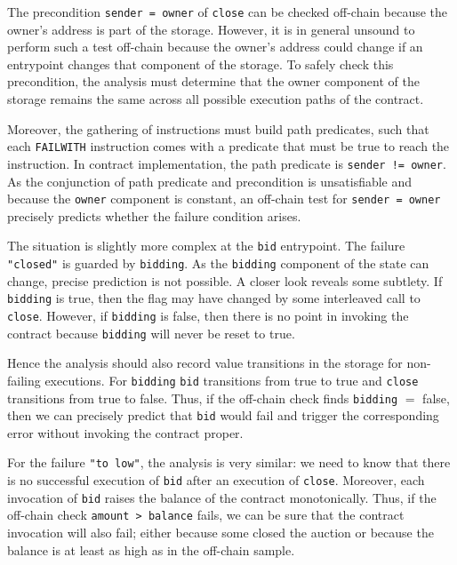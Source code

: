 \documentclass[a4paper,USenglish,american,cleveref, autoref, thm-restate]{oasics-v2021}
\begin{document}
The precondition \lstinline/sender = owner/ of \lstinline/close/ can
be checked off-chain because the owner's address is part of the
storage. However, it is in general unsound to perform such a test
off-chain because the owner's address could change if an entrypoint
changes that component of the storage. To safely check this
precondition, the analysis must determine that the owner component of
the storage remains the same across all possible execution paths of
the contract.

Moreover, the gathering of instructions must build path predicates,
such that each \lstinline/FAILWITH/ instruction comes with a predicate
that must be true to reach the instruction. In contract
implementation, the path predicate is \lstinline/sender != owner/. As
the conjunction of path predicate and precondition is unsatisfiable
and because the \lstinline/owner/ component is constant, an off-chain
test for \lstinline/sender = owner/ precisely predicts whether the
failure condition arises.

The situation is slightly more complex at the \lstinline/bid/
entrypoint. The failure \lstinline/"closed"/ is guarded by
\lstinline/bidding/. As the \lstinline/bidding/ component of the state can change,
precise prediction is not possible. A closer look reveals some
subtlety. If \lstinline/bidding/ is true, then the flag may have
changed by some interleaved call to \lstinline/close/. However, if
\lstinline/bidding/ is false, then there is no point in invoking the
contract because \lstinline/bidding/ will never be reset to true.

Hence the analysis should also record value transitions in the
storage for non-failing executions. For \lstinline/bidding/
\lstinline/bid/ transitions from true to true and \lstinline/close/
transitions from true to false. Thus, if the off-chain check finds
\lstinline/bidding/ $=$ false, then we can precisely predict that
\lstinline/bid/ would fail and trigger the corresponding error without
invoking the contract proper.

For the failure \lstinline/"to low"/, the analysis is very similar:
we need to know that there is no successful execution of
\lstinline/bid/ after an execution of \lstinline/close/. Moreover,
each invocation of \lstinline/bid/ raises the balance of the contract
monotonically. Thus, if the off-chain check
\lstinline/amount > balance/ fails, we can be sure that the contract
invocation will also fail; either because some closed the auction or
because the balance is at least as high as in the off-chain sample. 
\end{document}
